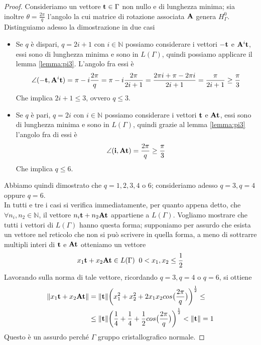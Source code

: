 \documentclass[a4paper,11pt,openright,twoside	]{book}
\begin{document}
\begin{proof}
Consideriamo un vettore $\vb{t} \in \Gamma$ non nullo e di lunghezza minima; sia inoltre $\theta =  \frac{2 \pi }{q}$ l'angolo la cui matrice di rotazione associata $\vb{A}$ genera $H_{\Gamma}^{0}$. \\
Distinguiamo adesso la dimostrazione in due casi
\begin{itemize}
\item Se $q$ è dispari, $q = 2i +1$ con $i \in \mathbb{N}$ possiamo considerare i vettori $-\vb{t}$ e $\vb{A}^{i} \vb{t}$, essi sono di lunghezza minima e sono in $L(\Gamma)$, quindi possiamo applicare il lemma \ref{lemma:pi3}. L'angolo fra essi è 
\[ \angle (-\vb{t}, \vb{A}^{i} \vb{t}) = \pi - i \frac{2 \pi}{q} = \pi - i \frac{2 \pi}{2i +1} = \frac{2 \pi i + \pi - 2 \pi i}{2i +1} = \frac{\pi}{2i +1} \geq \frac{\pi}{3}\]
Che implica $2i +1 \leq 3$, ovvero $q \leq 3$.
\item Se $q$ è pari, $q = 2i$ con $i \in \mathbb{N}$ possiamo considerare i vettori $\vb{t}$ e $\vb{At}$, essi sono di lunghezza minima e sono in $L(\Gamma)$, quindi grazie al lemma \ref{lemma:pi3} l'angolo fra di essi è
\[ \angle (\vb{i}, \vb{At}) = \frac{2 \pi }{q} \geq \frac{\pi}{3}\]
Che implica $q \leq 6$. \\
\end{itemize}
Abbiamo quindi dimostrato che $q = 1, 2, 3, 4$ o $6$; consideriamo adesso $q = 3, q = 4$ oppure $q = 6$. \\
In tutti e tre i casi si verifica immediatamente, per quanto appena detto, che $\forall n_i, n_2 \in \mathbb{N}$, il vettore $n_i \vb{t} + n_2 \vb{At} $ appartiene a $L(\Gamma)$. Vogliamo mostrare che tutti i vettori di $L(\Gamma)$ hanno questa forma; supponiamo per assurdo che esista un vettore nel reticolo che non si può scrivere in quella forma, a meno di sottrarre multipli interi di $\vb{t}$ e $\vb{At}$ otteniamo un vettore
\[ x_1 \vb{t} + x_2 \vb{At} \in L(\Gamma) \; \;  0 < x_1, x_2 \leq \frac{1}{2}\]
Lavorando sulla norma di tale vettore, ricordando $q = 3, q = 4$ o $q = 6$, si ottiene 
\begin{equation}
\label{eq:q346}
\begin{split}
\norm{ x_1 \vb{t} + x_2 \vb{At}} & = \norm{\vb{t}} \bigg( x_1^2 + x_2^2 + 2x_1 x_2 cos \big( \frac{2 \pi}{q} \big) \bigg)^{\frac{1}{2}} \leq \\
& \leq \norm{\vb{t}} \bigg( \frac{1}{4}+ \frac{1}{4} + \frac{1}{2} cos \big( \frac{2 \pi}{q} \big) \bigg)^{\frac{1}{2}} < \norm{\vb{t}} = 1
\end{split}
\end{equation}
Questo è un assurdo perché $\Gamma$ gruppo cristallografico normale. 
\end{proof}
\end{document}
